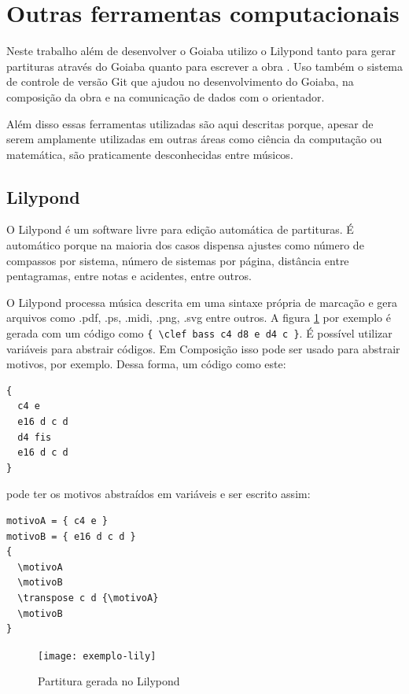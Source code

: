 \section{Outras ferramentas computacionais}
\label{sec:outr-ferr-comp}

Neste trabalho além de desenvolver o Goiaba utilizo o Lilypond tanto
para gerar partituras através do Goiaba quanto para escrever a obra
\obra{}. Uso também o sistema de controle de versão Git que ajudou no
desenvolvimento do Goiaba, na composição da obra e na comunicação de
dados com o orientador.

Além disso essas ferramentas utilizadas são aqui descritas porque,
apesar de serem amplamente utilizadas em outras áreas como ciência da
computação ou matemática, são praticamente desconhecidas entre
músicos.

\subsection{Lilypond}
\label{sec:lilypond}

O Lilypond \cite{nienhuys.ea08:lilypond} é um software livre para
edição automática de partituras. É automático porque na maioria dos
casos dispensa ajustes como número de compassos por sistema, número de
sistemas por página, distância entre pentagramas, entre notas e
acidentes, entre outros.

O Lilypond processa música descrita em uma sintaxe própria de marcação
e gera arquivos como .pdf, .ps, .midi, .png, .svg entre outros. A
figura \ref{fig:exemplo-lily} por exemplo é gerada com um código como
\verb!{ \clef bass c4 d8 e d4 c }!. É possível utilizar variáveis para
abstrair códigos. Em Composição isso pode ser usado para abstrair
motivos, por exemplo. Dessa forma, um código como este:

\begin{verbatim}
{
  c4 e
  e16 d c d
  d4 fis
  e16 d c d
}
\end{verbatim}

pode ter os motivos abstraídos em variáveis e ser escrito assim:

\begin{verbatim}
motivoA = { c4 e }
motivoB = { e16 d c d }
{
  \motivoA
  \motivoB
  \transpose c d {\motivoA}
  \motivoB
}
\end{verbatim}

\begin{figure}
  \centering
  \texttt{[image: exemplo-lily]}
  \caption{Partitura gerada no Lilypond}
  \label{fig:exemplo-lily}
\end{figure}

